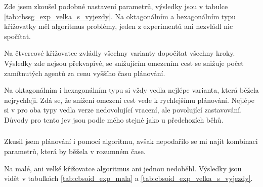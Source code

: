 Zde jsem zkoušel podobné nastavení parametrů, výsledky jsou v tabulce \ref{tab:cbssg_exp_velka_s_vyjezdy}.
Na oktagonálním a hexagonálním typu křižovatky měl algoritmus problémy, jeden z experimentů ani nezvládl nic spočítat.

Na čtvercové křižovatce zvládly všechny varianty dopočítat všechny kroky.
Výsledky zde nejsou překvapivé, se snižujícím omezením cest se snižuje počet zamítnutých agentů
za cenu vyššího času plánování.

Na oktagonálním i hexagonálním typu si vždy vedla nejlépe varianta, která běžela nejrychleji.
Zdá se, že snížení omezení cest vede k rychlejšímu plánování.
Nejlépe si v pro oba typy vedla verze nedovolující vracení, ale povolující zastavování.
Důvody pro tento jev jsou podle mého stejné jako u předchozích běhů.



\subsubsection{}
\label{subsubsec:exp_cbsoid}

Zkusil jsem plánování i pomocí  algoritmu, avšak nepodařilo se mi najít kombinaci parametrů,
která by běžela v rozumném čase.

Na malé, ani velké křižovatce algoritmus ani jednou nedoběhl.
Výsledky jsou vidět v tabulkách \ref{tab:cbsoid_exp_mala} a \ref{tab:cbsoid_exp_velka_s_vyjezdy}.



